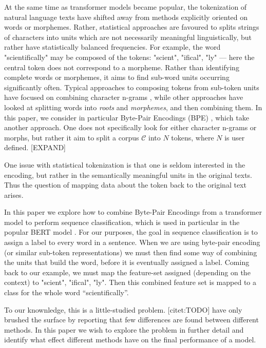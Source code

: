 \documentclass[11pt]{article}
\begin{document}
    	At the same time as transformer models became popular, the
     tokenization of natural language texts have shifted away from
     methods explicitly oriented on words or morphemes. Rather,
     statistical approaches are favoured to splits strings of
     characters into units which are not necessarily meaningful
     linguistically, but rather have statistically balanced
     frequencies. For example, the word "scientifically" may be
     composed of the tokens: "scient", "ifical", "ly" --- here the
     central token does not correspond to a morpheme.
            Rather than identifying complete words or morphemes, it
     aims to find sub-word units occurring significantly
     often. Typical approaches to composing tokens from sub-token
     units have focused on combining character n-grams
     \citep{bojanowski2017enriching}, while other approaches have
     looked at splitting words into \textit{roots} and
     \textit{morphemes}, and then combining them. In this paper, we
     consider in particular Byte-Pair Encodings (BPE)
     \citep{sennrich2015neural}, which take another approach. One does
     not specifically look for either character n-grams or morphs, but
     rather it aim to split a corpus $\mathcal{C}$ into $N$ tokens,
     where $N$ is user defined. [EXPAND]

            One issue with statistical tokenization is that one is
     seldom interested in the encoding, but rather in the semantically
     meaningful units in the original texts. Thus the question of
     mapping data about the token back to the original text arises.
        
    	In this paper we explore how to combine Byte-Pair Encodings
     from a transformer model to perform sequence classification,
     which is used in particular in the popular BERT model
     \citep{devlin2018bert}. For our purposes, the goal in sequence
     classification is to assign a label to every word in a
     sentence. When we are using byte-pair encoding (or similar
     sub-token representations) we must then find some way of
     combining the units that build the word, before it is eventually
     assigned a label. Coming back to our example, we must map the
     feature-set assigned (depending on the context) to "scient",
     "ifical", "ly". Then this combined feature set is mapped to a
     class for the whole word ``scientifically''.

    	To our knownledge, this is a little-studied
     problem. [citet:TODO] have only brushed the surface by reporting
     that few differences are found between different methods. In this
     paper we wish to explore the problem in further detail and
     identify what effect different methods have on the final
     performance of a model.
\end{document}
